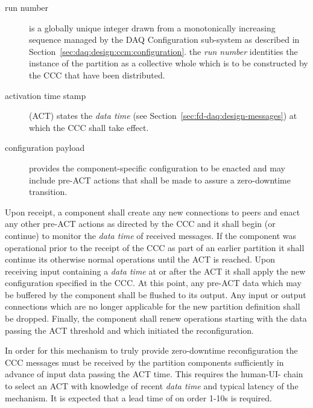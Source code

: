 \begin{description}
\item[run number] is a globally unique integer drawn from a monotonically increasing sequence managed by the DAQ Configuration sub-system as described in Section~\ref{sec:daq:design:ccm:configuration}. 
  the \textit{run number} identities the instance of the partition as a collective whole which is to be constructed by the CCC that have been distributed.
\item[activation time stamp] (ACT) states the \textit{data time} (see Section~\ref{sec:fd-daq:design-messages}) at which the CCC shall take effect. 
\item[configuration payload] provides the component-specific configuration to be enacted and may include  pre-ACT actions that shall be made to assure a zero-downtime transition.
\end{description}

Upon receipt, a component shall create any new connections to peers and enact any other pre-ACT actions as directed by the CCC and it shall begin (or continue) to monitor the \textit{data time} of received messages. 
If the component was operational prior to the receipt of the CCC as part of an earlier partition it shall continue its otherwise normal operations until the ACT is reached. 
Upon receiving input containing a \textit{data time} at or after the ACT it shall apply the new configuration specified in the CCC. 
At this point, any pre-ACT data which may be buffered by the component shall be flushed to its output. 
Any input or output connections which are no longer applicable for the new partition definition shall be dropped. 
Finally, the component shall renew operations starting with the data passing the ACT threshold and which initiated the reconfiguration.

In order for this mechanism to truly provide zero-downtime reconfiguration the CCC messages must be received by the partition components sufficiently in advance of input data passing the ACT time.
This requires the human-UI- chain to select an ACT with knowledge of recent \textit{data time} and typical latency of the mechanism. 
It is expected that a lead time of on order 1-10s is required. 

